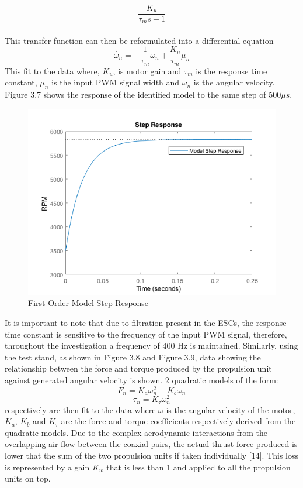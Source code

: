 \documentclass[12pt,a4paper,twoside]{report}
\begin{document}
			\\
			\[ \frac{K_u}{\tau_m s + 1} \]
			\\
			This transfer function can then be reformulated into a differential equation
			\begin{equation}
			\dot{\omega_n} = -\frac{1}{\tau_m}\omega_n	 + \frac{K_u}{\tau_m}\mu_n
			\end{equation}
			This fit to the data where, $K_u$, is motor gain and $\tau_m$ is the response time constant, $\mu_n$ is the input PWM signal width and $\omega_n$ is the angular velocity. Figure 3.7 shows the response of the identified model to the same step of 500$\mu s$.
			
			\begin{figure}[h!]
				\centering
				\includegraphics[width=0.7\linewidth]{ModelStep.png}
				\caption{First Order Model Step Response}
				\label{fig:modelstep}
			\end{figure}
			
			It is important to note that due to filtration present in the ESCs, the response time constant is sensitive to the frequency of the input PWM signal, therefore, throughout the investigation a frequency of 400 Hz is maintained. Similarly, using the test stand, as shown in Figure 3.8 and Figure 3.9, data showing the relationship between the force and torque produced by the propulsion unit against generated angular velocity is shown. 2 quadratic models of the form: 
			\begin{equation}
			F_n = K_a \omega_n^2 + K_b\omega_n
			\end{equation}
			\begin{equation}
			\tau_n = K_\tau \omega_n^2
			\end{equation}
			respectively are then fit to the data where $\omega$ is the angular velocity of the motor, $K_a$, $K_b$ and $K_\tau$ are the force and torque coefficients respectively derived from the quadratic models. Due to the complex aerodynamic interactions from the overlapping air flow between the coaxial pairs, the actual thrust force produced is lower that the sum of the two propulsion units if taken individually [14]. This loss is represented by a gain $K_w$ that is less than 1 and applied to all the propulsion units on top.	
			
\end{document}
